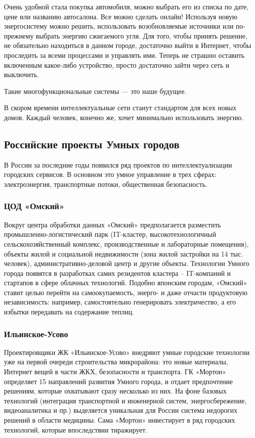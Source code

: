 Очень удобной стала покупка автомобиля, можно выбрать его из списка по дате, цене или названию автосалона. Все можно сделать онлайн! Используя новую энергосистему можно решить, использовать возобновляемые источники или по-прежнему выбрать энергию сжигаемого угля. Для того, чтобы принять решение, не обязательно находиться в данном городе, достаточно выйти в Интернет, чтобы проследить за всеми процессами и управлять ими. Теперь не страшно оставить включенным какое-либо устройство, просто достаточно зайти через сеть и выключить. 

Такие многофункциональные системы --- это наше будущее. 

В скором времени интеллектуальные сети станут стандартом для всех новых домов. Каждый человек, конечно же, хочет минимально использовать энергию.

\subsection{Российские проекты Умных городов}
В России за последние годы появился ряд проектов по интеллектуализации городских сервисов. В основном это умное управление
в трех сферах: электроэнергия, транспортные потоки, общественная
безопасность.\cite{smartcity}

\subsubsection{ЦОД «Омский»}
Вокруг центра обработки данных «Омский» предполагается разместить промышленно-логистический парк (IT-кластер, высокотехнологичный сельскохозяйственный комплекс, производственные и лабораторные помещения), объекты жилой и социальной недвижимости (зона жилой застройки на 14 тыс. человек), административно-деловой центр и другие
объекты. Технологии Умного города появятся в разработках самих резидентов кластера – IT-компаний и стартапов в сфере облачных технологий. Подобно японским городам, «Омский» ставит целью перейти
на самоокупаемость, энерго- и даже отчасти продуктовую независимость: например, самостоятельно генерировать электричество, а его избытки передавать на содержание теплиц.

\subsubsection{Ильинское-Усово}
Проектировщики ЖК «Ильинское-Усово» внедряют умные городские технологии уже на первой очереди строительства микрорайона: это новые материалы, Интернет вещей в части ЖКХ, безопасности и транспорта. ГК «Мортон» определяет 15 направлений развития Умного города, и отдает предпочтение решениям, которые охватывают сразу несколько из них. На фоне базовых технологий (интеграция транспортной и инженерной систем,
энергосбережение, видеоаналитика и пр.) выделяется уникальная для России система недорогих решений в области медицины. Сама «Мортон» инвестирует в ряд городских технологий, которые впоследствии тиражирует.

